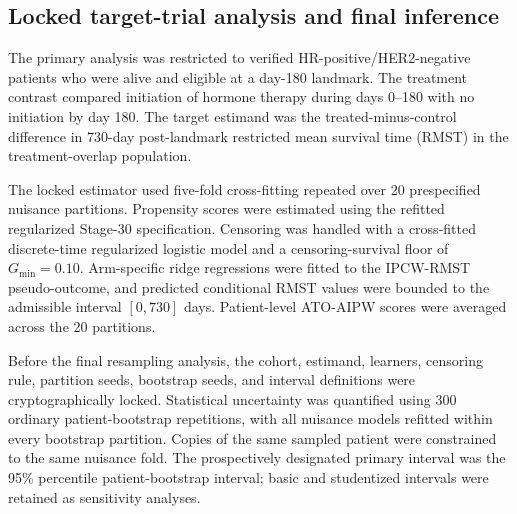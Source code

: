 \subsection{Locked target-trial analysis and final inference}

The primary analysis was restricted to verified HR-positive/HER2-negative patients who were alive and eligible at a day-180 landmark. The treatment contrast compared initiation of hormone therapy during days 0--180 with no initiation by day 180. The target estimand was the treated-minus-control difference in 730-day post-landmark restricted mean survival time (RMST) in the treatment-overlap population.

The locked estimator used five-fold cross-fitting repeated over 20 prespecified nuisance partitions. Propensity scores were estimated using the refitted regularized Stage-30 specification. Censoring was handled with a cross-fitted discrete-time regularized logistic model and a censoring-survival floor of $G_{\min}=0.10$. Arm-specific ridge regressions were fitted to the IPCW-RMST pseudo-outcome, and predicted conditional RMST values were bounded to the admissible interval $[0,730]$ days. Patient-level ATO-AIPW scores were averaged across the 20 partitions.

Before the final resampling analysis, the cohort, estimand, learners, censoring rule, partition seeds, bootstrap seeds, and interval definitions were cryptographically locked. Statistical uncertainty was quantified using 300 ordinary patient-bootstrap repetitions, with all nuisance models refitted within every bootstrap partition. Copies of the same sampled patient were constrained to the same nuisance fold. The prospectively designated primary interval was the 95\% percentile patient-bootstrap interval; basic and studentized intervals were retained as sensitivity analyses.
